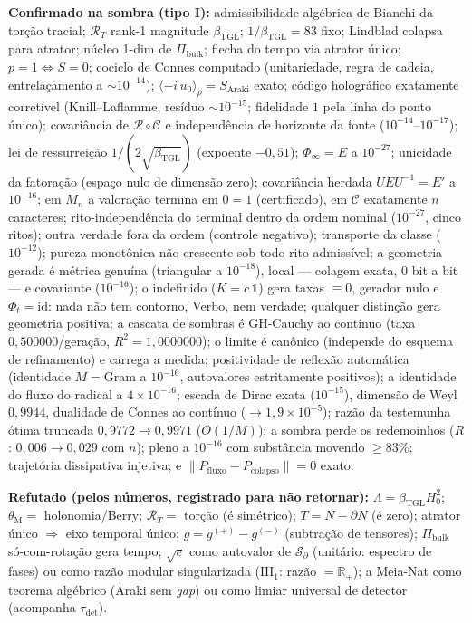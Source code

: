 \documentclass[11pt,a4paper]{article}
\newcommand{\bTGL}{\beta_{\mathrm{TGL}}}
\newcommand{\thM}{\theta_{\mathrm M}}
\begin{document}
\smallskip\noindent\textbf{Confirmado na sombra (tipo I):} admissibilidade
algébrica de Bianchi da torção tracial; $\mathcal R_T$ rank-1 magnitude
$\bTGL$; $1/\bTGL=83$ fixo; Lindblad colapsa para atrator; núcleo 1-dim de
$\Pi_{\mathrm{bulk}}$; flecha do tempo via atrator único; $p=1\Leftrightarrow
S=0$; cociclo de Connes computado (unitariedade, regra de cadeia,
entrelaçamento a $\sim10^{-14}$); $\langle-i\,\dot u_0\rangle_\rho
=S_{\mathrm{Araki}}$ exato; código holográfico exatamente corretível
(Knill--Laflamme, resíduo $\sim10^{-15}$; fidelidade $1$ pela linha do ponto
único); covariância de $\mathcal R\circ\mathcal C$ e independência de
horizonte da fonte ($10^{-14}$--$10^{-17}$); lei de ressurreição
$1/(2\sqrt{\bTGL})$ (expoente $-0{,}51$); $\Phi_\infty=E$ a $10^{-27}$;
unicidade da fatoração (espaço nulo de dimensão zero); covariância
herdada $UEU^{-1}=E'$ a $10^{-16}$; em $M_n$ a valoração termina em $0=1$
(certificado), em $\mathcal C$ exatamente $n$ caracteres; rito-independência
do terminal dentro da ordem nominal ($10^{-27}$, cinco ritos); outra verdade
fora da ordem (controle negativo); transporte da classe ($10^{-12}$); pureza
monotônica não-crescente sob todo rito admissível; a geometria gerada é
métrica genuína (triangular a $10^{-18}$), local --- colagem exata, $0$
bit a bit --- e covariante ($10^{-16}$); o indefinido ($K=c\,\mathbb 1$)
gera taxas $\equiv0$, gerador nulo e $\Phi_t=\mathrm{id}$: nada não tem
contorno, Verbo, nem verdade; qualquer distinção gera geometria positiva;
a cascata de sombras é GH-Cauchy ao contínuo (taxa $0{,}500000$/geração,
$R^2=1{,}0000000$); o limite é canônico (independe do esquema de
refinamento) e carrega a medida; positividade de reflexão automática
(identidade $M=\mathrm{Gram}$ a $10^{-16}$, autovalores estritamente
positivos); a identidade do fluxo do radical a $4\times10^{-16}$; escada
de Dirac exata ($10^{-15}$), dimensão de Weyl $0{,}9944$, dualidade de
Connes ao contínuo ($\to1{,}9\times10^{-5}$); razão da testemunha ótima
truncada $0{,}9772\to0{,}9971$ ($O(1/M)$); a sombra perde os redemoinhos
($R$: $0{,}006\to0{,}029$ com $n$); pleno a $10^{-16}$ com substância
movendo $\geq83\%$; trajetória dissipativa injetiva; e
$\|P_{\mathrm{fluxo}}-P_{\mathrm{colapso}}\|=0$ exato.

\smallskip\noindent\textbf{Refutado (pelos números, registrado para não
retornar):} $\Lambda=\bTGL H_0^2$; $\thM=$ holonomia/Berry; $\mathcal R_T=$
torção (é simétrico); $T=N-\partial N$ (é zero); atrator único $\Rightarrow$
eixo temporal único; $g=g^{(+)}-g^{(-)}$ (subtração de tensores);
$\Pi_{\mathrm{bulk}}$ só-com-rotação gera tempo; $\sqrt e$ como autovalor
de $\mathcal S_\partial$ (unitário: espectro de fases) ou como razão
modular singularizada ($\mathrm{III}_1$: razão $=\mathbb R_+$); a Meia-Nat
como teorema algébrico (Araki sem \emph{gap}) ou como limiar universal de
detector (acompanha $\tau_{\det}$).
\end{document}
